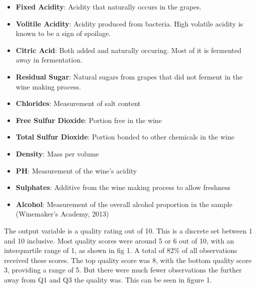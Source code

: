 \documentclass[a4paper,9pt,twocolumn,twoside,]{pinp}
\providecommand{\tightlist}{%
  \setlength{\itemsep}{0pt}\setlength{\parskip}{0pt}}
\begin{document}
\begin{itemize}
\tightlist
\item
  \textbf{Fixed Acidity}: Acidity that naturally occurs in the grapes.
\item
  \textbf{Volitile Acidity}: Acidity produced from bacteria. High
  volatile acidity is known to be a sign of spoilage.
\item
  \textbf{Citric Acid}: Both added and naturally occuring. Most of it is
  fermented away in fermentation.
\item
  \textbf{Residual Sugar}: Natural sugars from grapes that did not
  ferment in the wine making process.
\item
  \textbf{Chlorides}: Measurement of salt content
\item
  \textbf{Free Sulfur Dioxide}: Portion free in the wine
\item
  \textbf{Total Sulfur Dioxide}: Portion bonded to other chemicals in
  the wine
\item
  \textbf{Density}: Mass per volume
\item
  \textbf{PH}: Measurement of the wine's acidity
\item
  \textbf{Sulphates}: Additive from the wine making process to allow
  freshness
\item
  \textbf{Alcohol}: Measurement of the overall alcohol proportion in the
  sample \newline(Winemaker's Academy, 2013)
\end{itemize}

The output variable is a quality rating out of 10. This is a discrete
set between 1 and 10 inclusive. Most quality scores were around 5 or 6
out of 10, with an interquartile range of 1, as shown in fig 1. A total
of 82\% of all observations received these scores. The top quality score
was 8, with the bottom quality score 3, providing a range of 5. But
there were much fewer observations the further away from Q1 and Q3 the
quality was. This can be seen in figure 1.
\end{document}
